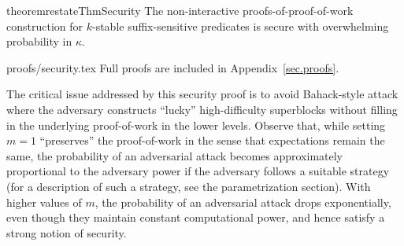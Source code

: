 %
%
\begin{restatable}{theorem}{restateThmSecurity}
    \label{thm.security}
    The non-interactive proofs-of-proof-of-work construction for $k$-stable
    suffix-sensitive predicates is secure with overwhelming probability in
    $\kappa$.
\end{restatable}

\ifonecolumn
{proofs/security.tex}
\else
Full proofs are included in Appendix~\ref{sec.proofs}.
\fi

The critical issue addressed by this security proof is to avoid Bahack-style
attack \cite{bahack} where the adversary constructs ``lucky'' high-difficulty
superblocks without filling in the underlying proof-of-work in the lower
levels. Observe that, while setting $m = 1$ ``preserves'' the proof-of-work in
the sense that expectations remain the same, the probability of an adversarial
attack becomes approximately proportional to the adversary power if the
adversary follows a suitable strategy (for a description of such a strategy,
see the parametrization section). With higher values of $m$, the probability of
an adversarial attack drops exponentially, even though they maintain constant
computational power, and hence satisfy a strong notion of security.

